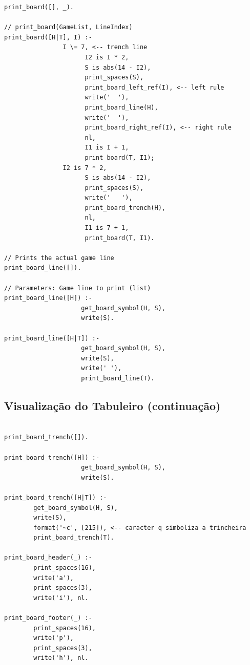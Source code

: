 \begin{lstlisting}
print_board([], _).

// print_board(GameList, LineIndex)
print_board([H|T], I) :-
                I \= 7, <-- trench line
                      I2 is I * 2,
                      S is abs(14 - I2),
                      print_spaces(S),
                      print_board_left_ref(I), <-- left rule
                      write('  '),
                      print_board_line(H),
                      write('  '),
                      print_board_right_ref(I), <-- right rule
                      nl,
                      I1 is I + 1,
                      print_board(T, I1);
                I2 is 7 * 2,
                      S is abs(14 - I2),
                      print_spaces(S),
                      write('   '),
                      print_board_trench(H),
                      nl,
                      I1 is 7 + 1,
                      print_board(T, I1).

// Prints the actual game line
print_board_line([]).

// Parameters: Game line to print (list)
print_board_line([H]) :-
                     get_board_symbol(H, S),
                     write(S).

print_board_line([H|T]) :-
                     get_board_symbol(H, S),
                     write(S),
                     write(' '),
                     print_board_line(T).

\end{lstlisting}

\newpage

\subsection{Visualização do Tabuleiro (continuação)}

\begin{lstlisting}

print_board_trench([]).

print_board_trench([H]) :-
                     get_board_symbol(H, S),
                     write(S).

print_board_trench([H|T]) :-
        get_board_symbol(H, S),
        write(S),
        format('~c', [215]), <-- caracter q simboliza a trincheira
        print_board_trench(T).

print_board_header(_) :-
        print_spaces(16),
        write('a'),
        print_spaces(3),
        write('i'), nl.

print_board_footer(_) :-
        print_spaces(16),
        write('p'),
        print_spaces(3),
        write('h'), nl.

\end{lstlisting}


